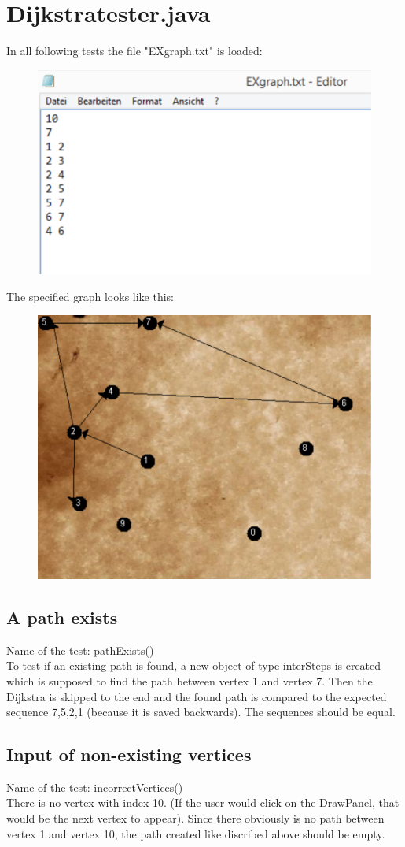 \documentclass{article}
\begin{document}
\section{Dijkstratester.java}
In all following tests the file "EXgraph.txt" is loaded:
\begin{figure}[H]
	\includegraphics[width=.7\textwidth,keepaspectratio]{./img/EXGraph.pdf}
\end{figure}
The specified graph looks like this:
\begin{figure}[H]
	\includegraphics[width=.7\textwidth,keepaspectratio]{./img/drawPanel.pdf}
\end{figure}
\subsection{A path exists}
Name of the test: pathExists()\\
To test if an existing path is found, a new object of type interSteps is created which is supposed to find the path between vertex 1 and vertex 7. Then the Dijkstra is skipped to the end and the found path is compared to the expected sequence 7,5,2,1 (because it is saved backwards). The sequences should be equal.
\subsection{Input of non-existing vertices}
Name of the test: incorrectVertices()\\
There is no vertex with index 10. (If the user would click on the DrawPanel, that would be the next vertex to appear). Since there obviously is no path between vertex 1 and vertex 10, the path created like discribed above should be empty.
\end{document}
